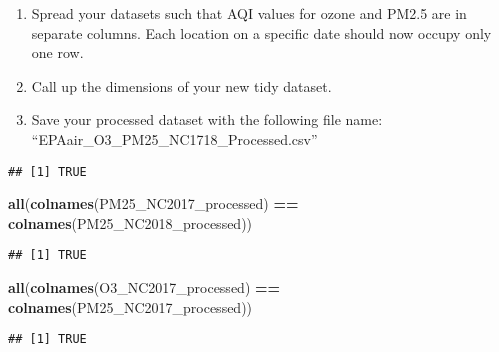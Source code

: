 \documentclass[]{article}
\newenvironment{Shaded}{\begin{snugshade}}{\end{snugshade}}
\newcommand{\KeywordTok}[1]{\textcolor[rgb]{0.13,0.29,0.53}{\textbf{#1}}}
\newcommand{\StringTok}[1]{\textcolor[rgb]{0.31,0.60,0.02}{#1}}
\newcommand{\CommentTok}[1]{\textcolor[rgb]{0.56,0.35,0.01}{\textit{#1}}}
\newcommand{\OperatorTok}[1]{\textcolor[rgb]{0.81,0.36,0.00}{\textbf{#1}}}
\newcommand{\NormalTok}[1]{#1}
\providecommand{\tightlist}{%
  \setlength{\itemsep}{0pt}\setlength{\parskip}{0pt}}
\begin{document}
\begin{enumerate}
\def\labelenumi{\arabic{enumi}.}
\setcounter{enumi}{8}
\tightlist
\item
  Spread your datasets such that AQI values for ozone and PM2.5 are in
  separate columns. Each location on a specific date should now occupy
  only one row.
\item
  Call up the dimensions of your new tidy dataset.
\item
  Save your processed dataset with the following file name:
  ``EPAair\_O3\_PM25\_NC1718\_Processed.csv''
\end{enumerate}

\begin{Shaded}
\end{Shaded}

\begin{verbatim}
## [1] TRUE
\end{verbatim}

\begin{Shaded}
\begin{Highlighting}[]
\KeywordTok{all}\NormalTok{(}\KeywordTok{colnames}\NormalTok{(PM25_NC2017_processed) }\OperatorTok{==}\StringTok{ }\KeywordTok{colnames}\NormalTok{(PM25_NC2018_processed))}
\end{Highlighting}
\end{Shaded}

\begin{verbatim}
## [1] TRUE
\end{verbatim}

\begin{Shaded}
\begin{Highlighting}[]
\KeywordTok{all}\NormalTok{(}\KeywordTok{colnames}\NormalTok{(O3_NC2017_processed) }\OperatorTok{==}\StringTok{ }\KeywordTok{colnames}\NormalTok{(PM25_NC2017_processed))}
\end{Highlighting}
\end{Shaded}

\begin{verbatim}
## [1] TRUE
\end{verbatim}
\end{document}
